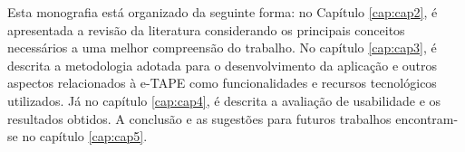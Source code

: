 \par
Esta monografia está organizado da seguinte forma: no Capítulo \ref{cap:cap2}, é apresentada a revisão da literatura considerando os principais conceitos necessários a uma melhor 
compreensão do trabalho. No capítulo \ref{cap:cap3}, é descrita a metodologia adotada para o desenvolvimento da aplicação e outros aspectos relacionados à e-TAPE como funcionalidades e 
recursos tecnológicos utilizados. Já no capítulo \ref{cap:cap4}, é descrita a avaliação de usabilidade e os resultados obtidos. 
A conclusão e as sugestões para futuros trabalhos encontram-se no capítulo \ref{cap:cap5}.
